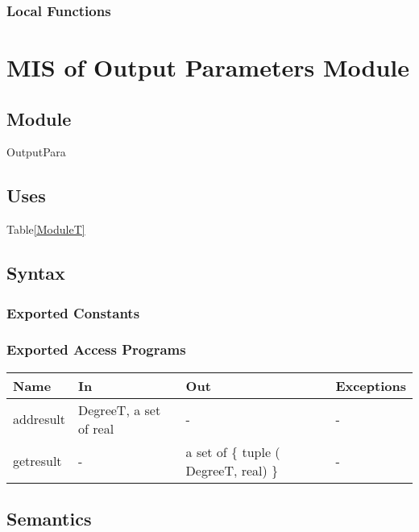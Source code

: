 \documentclass[12pt, titlepage]{article}
\begin{document}
\subsubsection{Local Functions}

\section{MIS of Output Parameters Module} \label{ModuleOP} 

\subsection{Module}
OutputPara

\subsection{Uses}
Table\ref{ModuleT}\\

\subsection{Syntax}

\subsubsection{Exported Constants}


\subsubsection{Exported Access Programs}

\begin{center}
\begin{tabular}{p{2cm} p{5cm} p{5cm} p{2cm}}
\hline
\textbf{Name} & \textbf{In} & \textbf{Out} & \textbf{Exceptions} \\
\hline 

addresult &  DegreeT, a set of real & - & - \\
getresult & - & a set of \{ tuple ( DegreeT, real) \} & - \\



\hline
\end{tabular}
\end{center}


\subsection{Semantics}
\end{document}
